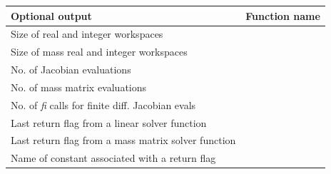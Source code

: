 \documentclass[letterpaper,10pt,english]{sphinxmanual}
\begin{document}
\begin{tabulary}{\linewidth}{|L|L|}
\hline
\textbf{\relax 
Optional output
} & \textbf{\relax 
Function name
}\\\hline

Size of real and integer workspaces
 & 
{\hyperref[c_interface/User_callable:ARKDlsGetWorkSpace]{}}
\\\hline

Size of mass real and integer workspaces
 & 
{\hyperref[c_interface/User_callable:ARKDlsGetMassWorkSpace]{}}
\\\hline

No. of Jacobian evaluations
 & 
{\hyperref[c_interface/User_callable:ARKDlsGetNumJacEvals]{}}
\\\hline

No. of mass matrix evaluations
 & 
{\hyperref[c_interface/User_callable:ARKDlsGetNumMassEvals]{}}
\\\hline

No. of \emph{fi} calls for finite diff. Jacobian evals
 & 
{\hyperref[c_interface/User_callable:ARKDlsGetNumRhsEvals]{}}
\\\hline

Last return flag from a linear solver function
 & 
{\hyperref[c_interface/User_callable:ARKDlsGetLastFlag]{}}
\\\hline

Last return flag from a mass matrix solver function
 & 
{\hyperref[c_interface/User_callable:ARKDlsGetLastMassFlag]{}}
\\\hline

Name of constant associated with a return flag
 & 
{\hyperref[c_interface/User_callable:ARKDlsGetReturnFlagName]{}}
\\\hline
\end{tabulary}

\end{document}
